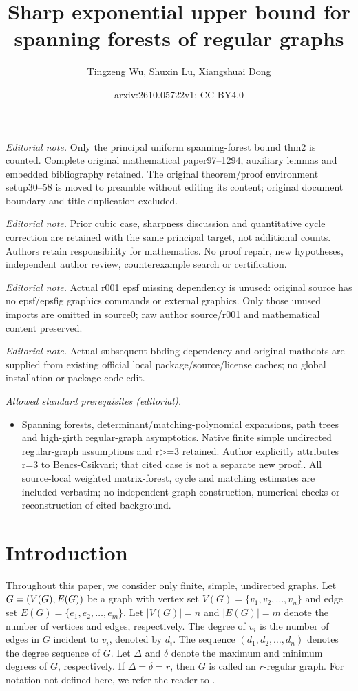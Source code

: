 \documentclass[11pt, a4paper]{article}
\title{Sharp exponential upper bound for spanning forests of regular graphs}
\author{Tingzeng Wu, Shuxin Lu, Xiangshuai Dong}
\date{arxiv:2610.05722v1; CC BY4.0}
\theoremstyle{plain}
\begin{document}
\maketitle
\noindent\textit{Editorial note.} Only the principal uniform spanning-forest bound thm2 is counted. Complete original mathematical paper97--1294, auxiliary lemmas and embedded bibliography retained. The original theorem/proof environment setup30--58 is moved to preamble without editing its content; original document boundary and title duplication excluded.\par\medskip
\noindent\textit{Editorial note.} Prior cubic case, sharpness discussion and quantitative cycle correction are retained with the same principal target, not additional counts. Authors retain responsibility for mathematics. No proof repair, new hypotheses, independent author review, counterexample search or certification.\par\medskip
\noindent\textit{Editorial note.} Actual r001 epsf missing dependency is unused: original source has no epsf/epsfig graphics commands or external graphics. Only those unused imports are omitted in source0; raw author source/r001 and mathematical content preserved.\par\medskip
\noindent\textit{Editorial note.} Actual subsequent bbding dependency and original mathdots are supplied from existing official local package/source/license caches; no global installation or package code edit.\par\medskip
\noindent\textit{Allowed standard prerequisites (editorial).}\begin{itemize}
\item Spanning forests, determinant/matching-polynomial expansions, path trees and high-girth regular-graph asymptotics. Native finite simple undirected regular-graph assumptions and r>=3 retained. Author explicitly attributes r=3 to Bencs-Csikvari; that cited case is not a separate new proof.. All source-local weighted matrix-forest, cycle and matching estimates are included verbatim; no independent graph construction, numerical checks or reconstruction of cited background.
\end{itemize}\medskip
\section{Introduction}

Throughout this paper, we consider only finite, simple, undirected graphs.
Let $G = (V(G), \\E(G))$ be a graph with vertex set $V(G) = \{v_1, v_2, \dots, v_n\}$
and edge set $E(G) = \{e_1, e_2, \dots, e_m\}$.
Let $|V(G)| = n$ and $|E(G)| = m$ denote the number of vertices and edges, respectively.
The degree of $v_i$ is the number of edges in $G$ incident to $v_i$, denoted by $d_i$.    
The sequence $(d_1, d_2, \dots, d_n)$ denotes the degree sequence of $G$.
Let $\Delta$ and $\delta$ denote the maximum and minimum degrees of $G$, respectively.
If $\Delta = \delta = r$, then $G$ is called an $r$-regular graph.
For notation not defined here, we refer the reader to \cite{Diestel2017}.
\end{document}
